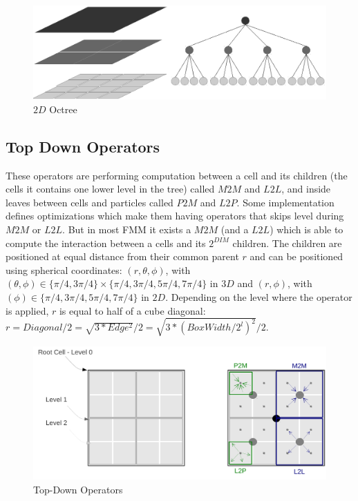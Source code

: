 \documentclass[12pt]{article} %
\begin{document}
\begin{figure}[h]
\centering
\includegraphics[scale=0.6]{../Images/Octree}
\caption{$2D$ Octree}
\end{figure}

\subsection{Top Down Operators}
These operators are performing computation between a cell and its children (the cells it contains one lower level in the tree) called $M2M$ and $L2L$,
and inside leaves between cells and particles called $P2M$ and $L2P$.
Some implementation defines optimizations which make them having operators that skips level during $M2M$ or $L2L$.
But in most FMM it exists a $M2M$ (and a $L2L$) which is able to compute the interaction between a cells and its $2^{DIM}$ children.
The children are positioned at equal distance from their common parent $r$ and can be positioned using spherical coordinates:
$(r,\theta,\phi)$, with $(\theta,\phi) \in \{\pi/4,3\pi/4\} \times \{\pi/4, 3\pi/4, 5\pi/4, 7\pi/4\}$ in $3D$ and
$(r,\phi)$, with $(\phi) \in \{\pi/4, 3\pi/4, 5\pi/4, 7\pi/4\}$ in $2D$.
Depending on the level where the operator is applied, $r$ is equal to half of a cube diagonal:
$r = Diagonal/2 = \sqrt{ 3 * Edge^2 }/2 = \sqrt{ 3 * (BoxWidth/2^{l})^2 }/2$.

\begin{figure}[h]
\centering
\includegraphics[scale=0.6]{../Images/TopDownOperators}
\caption{Top-Down Operators}
\end{figure}
\end{document}
